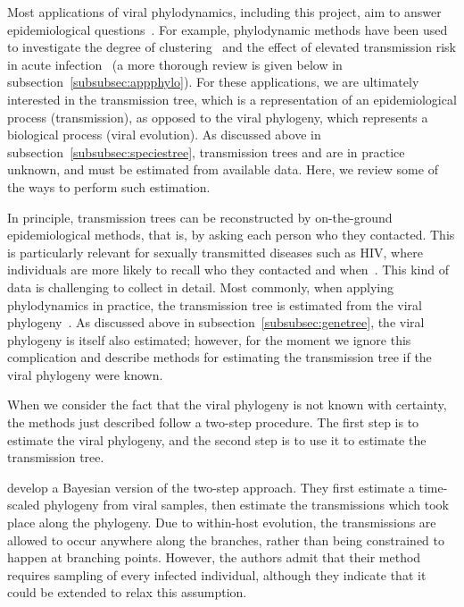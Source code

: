 Most applications of viral phylodynamics, including this project, aim to answer
epidemiological questions~\autocite{pybus2009evolutionary, volz2013viral}. For
example, phylodynamic methods have been used to investigate the degree of
clustering~\autocite{hughes2009molecular} and the effect of elevated
transmission risk in acute infection~\autocite{volz2012simple} (a more thorough
review is given below in subsection~\ref{subsubsec:appphylo}). For these
applications, we are ultimately interested in the transmission tree, which is a
representation of an epidemiological process (transmission), as opposed to the
viral phylogeny, which represents a biological process (viral evolution). As
discussed above in subsection~\ref{subsubsec:speciestree}, transmission trees
and are in practice unknown, and must be estimated from available data. Here,
we review some of the ways to perform such estimation.

In principle, transmission trees can be reconstructed by on-the-ground
epidemiological methods, that is, by asking each person who they contacted.
This is particularly relevant for sexually transmitted diseases such as HIV,
where individuals are more likely to recall who they contacted and
when~\autocite{klovdahl1985social}. This kind of data is challenging to collect
in detail. Most commonly, when applying phylodynamics in practice, the
transmission tree is estimated from the viral
phylogeny~\autocite{volz2013viral}. As discussed above in
subsection~\ref{subsubsec:genetree}, the viral phylogeny is itself also estimated;
however, for the moment we ignore this complication and describe methods for
estimating the transmission tree if the viral phylogeny were known.

When we consider the fact that the viral phylogeny is not known with certainty,
the methods just described follow a two-step procedure. The first step is to
estimate the viral phylogeny, and the second step is to use it to estimate the
transmission tree.

\autocite{didelot2014bayesian} develop a Bayesian version of the two-step
approach. They first estimate a time-scaled phylogeny from viral samples, then
estimate the transmissions which took place along the phylogeny. Due to
within-host evolution, the transmissions are allowed to occur anywhere along
the branches, rather than being constrained to happen at branching points.
However, the authors admit that their method requires sampling of every
infected individual, although they indicate that it could be extended to relax
this assumption.

